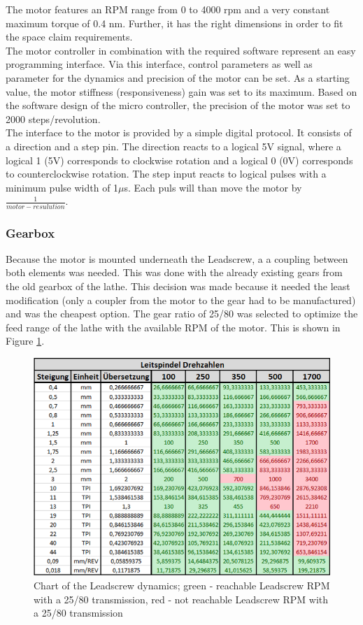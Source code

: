 The motor features an RPM range from 0 to 4000 rpm and a very constant maximum torque of 0.4 nm. Further, it has the right dimensions in order to fit the space claim requirements.\\
The motor controller in combination with the required software represent an easy programming interface. Via this interface, control parameters as well as parameter for the dynamics and precision of the motor can be set. As a starting value, the motor stiffness (responsiveness) gain was set to its maximum. Based on the software design of the micro controller, the precision of the motor was set to 2000 steps/revolution.\\
The interface to the motor is provided by a simple digital protocol. It consists of a direction and a step pin. The direction reacts to a logical 5V signal, where a logical 1 (5V) corresponds to clockwise rotation and a logical 0 (0V) corresponds to counterclockwise rotation. The step input reacts to logical pulses with a minimum pulse width of 1$\mu$s. Each puls will than move the motor by $\frac{1}{motor-resulution}$.

\subsubsection{Gearbox}
Because the motor is mounted underneath the Leadscrew, a a coupling between both elements was needed. This was done with the already existing gears from the old gearbox of the lathe. This decision was made because it needed the least modification (only a coupler from the motor to the gear had to be manufactured) and was the cheapest option. The gear ratio of 25/80 was selected to optimize the feed range of the lathe with the available RPM of the motor. This is shown in Figure \ref{Chart Leadscrew Dynamics}.

\begin{figure}
    \begin{center}
    \includegraphics[width=12cm]{Pictures/TransmissionDynamics.png}
    \caption[Chart of the Leadscrew dynamics]{Chart of the Leadscrew dynamics; green - reachable Leadscrew RPM with a 25/80 transmission, red - not reachable Leadscrew RPM with a 25/80 transmission}
    \label{Chart Leadscrew Dynamics}
    \end{center}
\end{figure}

